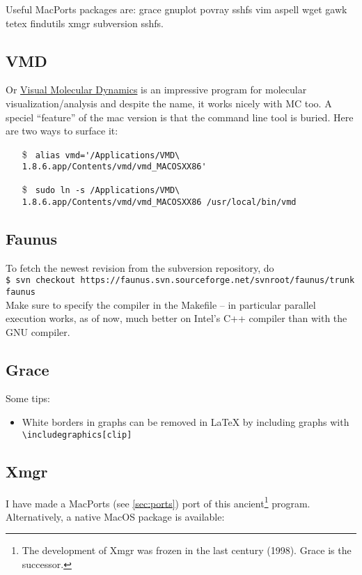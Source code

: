 \documentclass[a4paper,10pt]{article}
\begin{document}
Useful MacPorts packages are: grace gnuplot povray sshfs vim aspell wget gawk tetex findutils xmgr subversion sshfs.


\subsection{VMD}
Or \href{http://www.google.com/search?q=vmd}{Visual Molecular Dynamics} is an impressive program for molecular visualization/analysis and despite the name, it works nicely with MC too. A speciel ``feature'' of the mac version is that the command line tool is buried. Here are two ways to surface it:
\begin{itemize}
\item[\$] \verb+ alias vmd='/Applications/VMD\ 1.8.6.app/Contents/vmd/vmd_MACOSXX86'+
\item[\$] \verb+ sudo ln -s /Applications/VMD\ 1.8.6.app/Contents/vmd/vmd_MACOSXX86 /usr/local/bin/vmd+\end{itemize}

\subsection{Faunus}
To fetch the newest revision from the subversion repository, do\\

\verb+$ svn checkout https://faunus.svn.sourceforge.net/svnroot/faunus/trunk faunus+\\

\noindent Make sure to specify the compiler in the Makefile -- in particular parallel execution works, as of now, much better on Intel's C++ compiler than with the GNU compiler.

\subsection{\label{sec:grace}Grace}
Some tips:
\begin{itemize}
\item White borders in graphs can be removed in \LaTeX{} by including graphs with\\

\verb+\includegraphics[clip]+
\end{itemize}

\subsection{Xmgr}
I have made a MacPorts (see \ref{sec:ports}) port of this ancient\footnote{The development of Xmgr was frozen in the last century (1998). Grace is the successor.} program. Alternatively, a native MacOS package is available:\\
\end{document}
